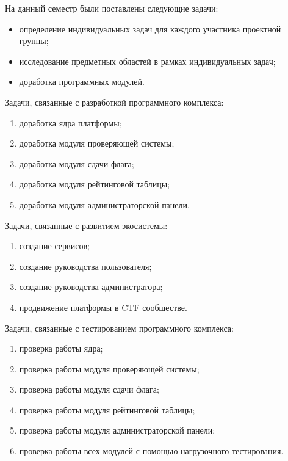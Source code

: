 На данный семестр были поставлены следующие задачи:

\begin{itemize}
\item определение индивидуальных задач для каждого участника проектной группы;
\item исследование предметных областей в рамках индивидуальных задач;
\item доработка программных модулей.
\end{itemize}

Задачи, связанные с разработкой программного комплекса:

\begin{enumerate}
\item доработка ядра платформы;
\item доработка модуля проверяющей системы;
\item доработка модуля сдачи флага;
\item доработка модуля рейтинговой таблицы;
\item доработка модуля администраторской панели.
\end{enumerate}

Задачи, связанные с развитием экосистемы:

\begin{enumerate}
\item создание сервисов;
\item создание руководства пользователя;
\item создание руководства администратора;
\item продвижение платформы в CTF сообществе.
\end{enumerate}

Задачи, связанные с тестированием программного комплекса:

\begin{enumerate}
\item проверка работы ядра;
\item проверка работы модуля проверяющей системы;
\item проверка работы модуля сдачи флага;
\item проверка работы модуля рейтинговой таблицы;
\item проверка работы модуля администраторской панели;
\item проверка работы всех модулей с помощью нагрузочного тестирования.
\end{enumerate}

